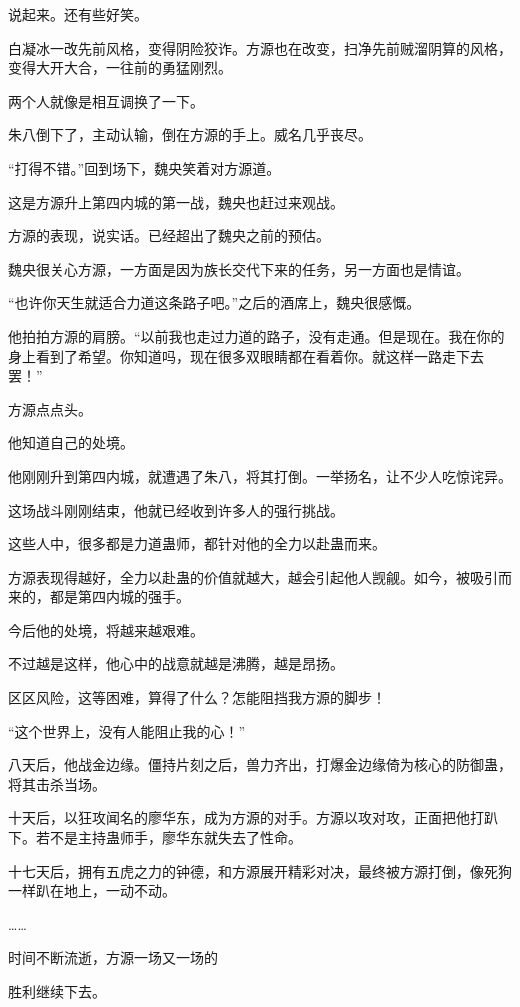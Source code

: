 \begin{this_body}
说起来。还有些好笑。

白凝冰一改先前风格，变得阴险狡诈。方源也在改变，扫净先前贼溜阴算的风格，变得大开大合，一往前的勇猛刚烈。

两个人就像是相互调换了一下。

朱八倒下了，主动认输，倒在方源的手上。威名几乎丧尽。

“打得不错。”回到场下，魏央笑着对方源道。

这是方源升上第四内城的第一战，魏央也赶过来观战。

方源的表现，说实话。已经超出了魏央之前的预估。

魏央很关心方源，一方面是因为族长交代下来的任务，另一方面也是情谊。

“也许你天生就适合力道这条路子吧。”之后的酒席上，魏央很感慨。

他拍拍方源的肩膀。“以前我也走过力道的路子，没有走通。但是现在。我在你的身上看到了希望。你知道吗，现在很多双眼睛都在看着你。就这样一路走下去罢！”

方源点点头。

他知道自己的处境。

他刚刚升到第四内城，就遭遇了朱八，将其打倒。一举扬名，让不少人吃惊诧异。

这场战斗刚刚结束，他就已经收到许多人的强行挑战。

这些人中，很多都是力道蛊师，都针对他的全力以赴蛊而来。

方源表现得越好，全力以赴蛊的价值就越大，越会引起他人觊觎。如今，被吸引而来的，都是第四内城的强手。

今后他的处境，将越来越艰难。

不过越是这样，他心中的战意就越是沸腾，越是昂扬。

区区风险，这等困难，算得了什么？怎能阻挡我方源的脚步！

“这个世界上，没有人能阻止我的心！”

八天后，他战金边缘。僵持片刻之后，兽力齐出，打爆金边缘倚为核心的防御蛊，将其击杀当场。

十天后，以狂攻闻名的廖华东，成为方源的对手。方源以攻对攻，正面把他打趴下。若不是主持蛊师手，廖华东就失去了性命。

十七天后，拥有五虎之力的钟德，和方源展开精彩对决，最终被方源打倒，像死狗一样趴在地上，一动不动。

……

时间不断流逝，方源一场又一场的

胜利继续下去。


\end{this_body}

